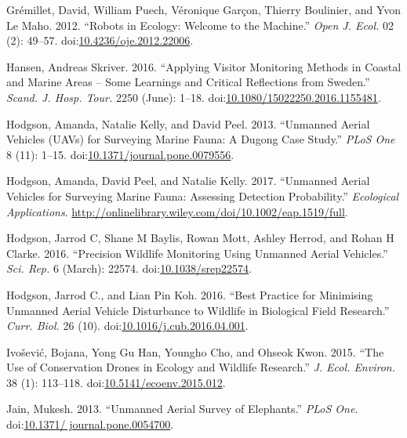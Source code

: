 \documentclass[]{interact}
\theoremstyle{plain}%
\theoremstyle{definition}
\theoremstyle{remark}
\begin{document}
\hypertarget{ref-gremillet_robots_2012}{}
Grémillet, David, William Puech, Véronique Garçon, Thierry Boulinier,
and Yvon Le Maho. 2012. ``Robots in Ecology: Welcome to the Machine.''
\emph{Open J. Ecol.} 02 (2): 49--57.
doi:\href{https://doi.org/10.4236/oje.2012.22006}{10.4236/oje.2012.22006}.

\hypertarget{ref-hansen_applying_2016}{}
Hansen, Andreas Skriver. 2016. ``Applying Visitor Monitoring Methods in
Coastal and Marine Areas -- Some Learnings and Critical Reflections from
Sweden.'' \emph{Scand. J. Hosp. Tour.} 2250 (June): 1--18.
doi:\href{https://doi.org/10.1080/15022250.2016.1155481}{10.1080/15022250.2016.1155481}.

\hypertarget{ref-hodgson_unmanned_2013}{}
Hodgson, Amanda, Natalie Kelly, and David Peel. 2013. ``Unmanned Aerial
Vehicles (UAVs) for Surveying Marine Fauna: A Dugong Case Study.''
\emph{PLoS One} 8 (11): 1--15.
doi:\href{https://doi.org/10.1371/journal.pone.0079556}{10.1371/journal.pone.0079556}.

\hypertarget{ref-hodgson_unmanned_2017}{}
Hodgson, Amanda, David Peel, and Natalie Kelly. 2017. ``Unmanned Aerial
Vehicles for Surveying Marine Fauna: Assessing Detection Probability.''
\emph{Ecological Applications}.
\url{http://onlinelibrary.wiley.com/doi/10.1002/eap.1519/full}.

\hypertarget{ref-hodgson_precision_2016}{}
Hodgson, Jarrod C, Shane M Baylis, Rowan Mott, Ashley Herrod, and Rohan
H Clarke. 2016. ``Precision Wildlife Monitoring Using Unmanned Aerial
Vehicles.'' \emph{Sci. Rep.} 6 (March): 22574.
doi:\href{https://doi.org/10.1038/srep22574}{10.1038/srep22574}.

\hypertarget{ref-hodgson_best_2016}{}
Hodgson, Jarrod C., and Lian Pin Koh. 2016. ``Best Practice for
Minimising Unmanned Aerial Vehicle Disturbance to Wildlife in Biological
Field Research.'' \emph{Curr. Biol.} 26 (10).
doi:\href{https://doi.org/10.1016/j.cub.2016.04.001}{10.1016/j.cub.2016.04.001}.

\hypertarget{ref-ivosevic_use_2015}{}
Ivošević, Bojana, Yong Gu Han, Youngho Cho, and Ohseok Kwon. 2015. ``The
Use of Conservation Drones in Ecology and Wildlife Research.'' \emph{J.
Ecol. Environ.} 38 (1): 113--118.
doi:\href{https://doi.org/10.5141/ecoenv.2015.012}{10.5141/ecoenv.2015.012}.

\hypertarget{ref-jain_unmanned_2013}{}
Jain, Mukesh. 2013. ``Unmanned Aerial Survey of Elephants.'' \emph{PLoS
One}.
doi:\href{https://doi.org/10.1371/\%20journal.pone.0054700}{10.1371/ journal.pone.0054700}.
\end{document}
